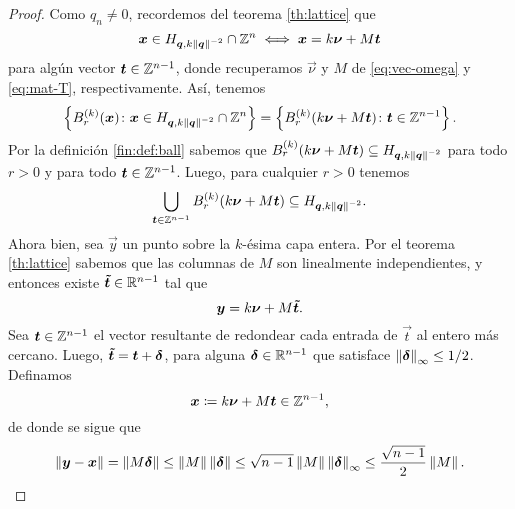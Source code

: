\begin{proof}
	Como $q_n \neq 0$, recordemos del teorema \eqref{th:lattice} que
	\begin{equation*}
		\boldsymbol{x} \in H_{\boldsymbol{q}, k\left\lVert \boldsymbol{q} \right\rVert^{-2}} \cap \mathbb{Z}^n \iff \boldsymbol{x} = k\boldsymbol{\nu} + M\boldsymbol{t}
	\end{equation*}
	para algún vector $\boldsymbol{t} \in \mathbb{Z}^{n-1}$, donde recuperamos $\vec{\nu}$ y $M$ de
	\eqref{eq:vec-omega} y \eqref{eq:mat-T}, respectivamente. Así, tenemos
	\begin{equation*}
		\left\lbrace B_r^{(k)}(\boldsymbol{x}) \colon \boldsymbol{x} \in H_{\boldsymbol{q}, k\left\lVert \boldsymbol{q} \right\rVert^{-2}} \cap
			\mathbb{Z}^n \right\rbrace
			=
		\left\lbrace B_r^{(k)}(k\boldsymbol{\nu} + M\boldsymbol{t}) \colon \boldsymbol{t} \in \mathbb{Z}^{n-1} \right\rbrace.
	\end{equation*}
	Por la definición \ref{fin:def:ball} sabemos que $B_r^{(k)}(k\boldsymbol{\nu} + M\boldsymbol{t}) \subseteq H_{\boldsymbol{q},
	k\left\lVert \boldsymbol{q} \right\rVert^{-2}}$ para todo $r > 0$ y para todo $\boldsymbol{t} \in \mathbb{Z}^{n-1}$. Luego, para
	cualquier $r > 0$ tenemos
	\begin{equation}
		\label{eq:ball-cover:1}
		\bigcup_{\boldsymbol{t} \in \mathbb{Z}^{n-1}}B_r^{(k)}(k\boldsymbol{\nu} + M\boldsymbol{t}) \subseteq
		H_{\boldsymbol{q}, k\left\lVert \boldsymbol{q} \right\rVert^{-2}}.
	\end{equation}
	Ahora bien, sea $\vec{y}$ un punto sobre la $k$-ésima capa entera. Por el
	teorema \ref{th:lattice} sabemos que las columnas de $M$ son linealmente
	independientes, y entonces existe $\boldsymbol{\tilde{t}} \in \mathbb{R}^{n-1}$ tal que
	\begin{equation*}
		\boldsymbol{y} = k\boldsymbol{\nu} + M\boldsymbol{\tilde{t}}.
	\end{equation*}
	Sea $\boldsymbol{t} \in \mathbb{Z}^{n-1}$ el vector resultante de redondear cada entrada de
	$\vec{t}$ al entero más cercano. Luego, $\boldsymbol{\tilde{t}} = \boldsymbol{t} + \boldsymbol{\delta}$,
	para alguna $\boldsymbol{\delta} \in \mathbb{R}^{n-1}$ que satisface $\left\lVert \boldsymbol{\delta} \right\rVert_{\infty} \leq 1/2$.
	Definamos
	\begin{equation*}
		\boldsymbol{x} \coloneq k\boldsymbol{\nu} + M\boldsymbol{t} \in \mathbb{Z}^{n-1},
	\end{equation*}
	de donde se sigue que
	\begin{equation*}
		\left\lVert \boldsymbol{y} - \boldsymbol{x} \right\rVert
		= \left\lVert M\boldsymbol{\delta} \right\rVert
		\leq \left\lVert M \right\rVert\left\lVert \boldsymbol{\delta} \right\rVert
		\leq \sqrt{n - 1}\left\lVert M \right\rVert\left\lVert \boldsymbol{\delta} \right\rVert_\infty
		\leq \frac{\sqrt{n - 1}}{2}\left\lVert M \right\rVert.
	\end{equation*}

\end{proof}
